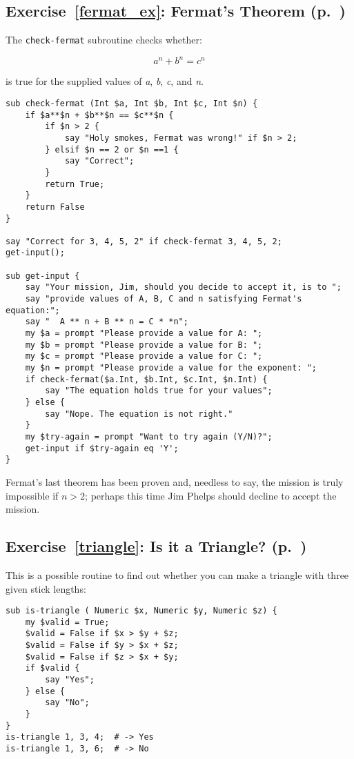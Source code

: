 \subsection{Exercise~\ref{fermat_ex}: Fermat's Theorem (p.~\pageref{fermat_ex})}
\label{sol_fermat_ex}

The {\tt check-fermat} subroutine checks whether:

\[ a^n + b^n = c^n \]
%

is true for the supplied values of \emph{a}, \emph{b}, 
\emph{c}, and \emph{n}.

\begin{verbatim}
sub check-fermat (Int $a, Int $b, Int $c, Int $n) {
    if $a**$n + $b**$n == $c**$n {
        if $n > 2 {
            say "Holy smokes, Fermat was wrong!" if $n > 2;
        } elsif $n == 2 or $n ==1 {
            say "Correct";
        }
        return True; 
    }
    return False
}

say "Correct for 3, 4, 5, 2" if check-fermat 3, 4, 5, 2;
get-input();

sub get-input {
    say "Your mission, Jim, should you decide to accept it, is to ";
    say "provide values of A, B, C and n satisfying Fermat's equation:";
    say "  A ** n + B ** n = C * *n";
    my $a = prompt "Please provide a value for A: ";
    my $b = prompt "Please provide a value for B: ";
    my $c = prompt "Please provide a value for C: ";
    my $n = prompt "Please provide a value for the exponent: ";
    if check-fermat($a.Int, $b.Int, $c.Int, $n.Int) {
        say "The equation holds true for your values";
    } else {
        say "Nope. The equation is not right."
    }
    my $try-again = prompt "Want to try again (Y/N)?";
    get-input if $try-again eq 'Y';
}
\end{verbatim}
%

Fermat's last theorem has been proven and, needless to say, 
the mission is truly impossible if $n > 2$; perhaps this 
time Jim Phelps should decline to accept the mission.

\subsection{Exercise~\ref{triangle}: Is it a Triangle? (p.~\pageref{triangle})}
\label{sol_triangle}

This is a possible routine to find out whether you can 
make a triangle with three given stick lengths:

\begin{verbatim}
sub is-triangle ( Numeric $x, Numeric $y, Numeric $z) {
    my $valid = True;
    $valid = False if $x > $y + $z;
    $valid = False if $y > $x + $z;
    $valid = False if $z > $x + $y;
    if $valid {
        say "Yes"; 
    } else {
        say "No";
    }
}
is-triangle 1, 3, 4;  # -> Yes
is-triangle 1, 3, 6;  # -> No
\end{verbatim}


